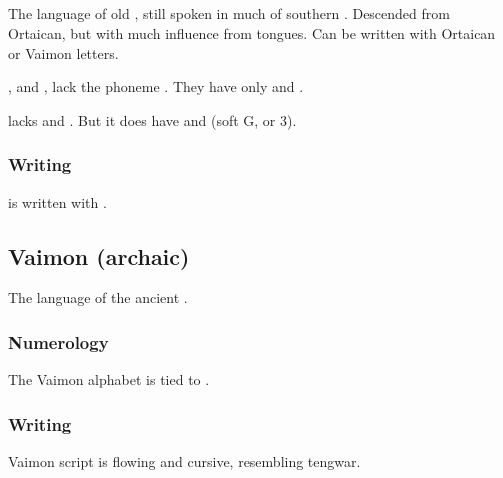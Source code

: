 \subsection{\Tepharin}
The language of old \Tephar, still spoken in much of southern \Velcad. 
Descended from Ortaican, but with much influence from \human{} tongues. 
Can be written with Ortaican or Vaimon letters. 

\Tepharin, and \Ortaican, lack the phoneme \txipa{[v]}. 
They have only \txipa{[w]} and \txipa{[hw]}. 

\Tepharin{} lacks \txipa{[z]} and \txipa{[S]}.
But it does have \txipa{[D]} and \txipa{[3]} (soft G, or 3). 










\subsubsection{Writing}
\Tepharin{} is written with . 









\subsection{Vaimon (archaic)}
The language of the ancient . 









\subsubsection{Numerology}
The Vaimon alphabet is tied to . 





\subsubsection{Writing}
Vaimon script is flowing and cursive, resembling tengwar. 









